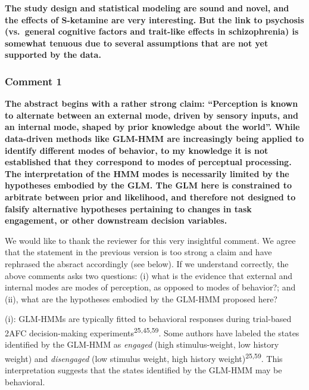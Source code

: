 \documentclass[
]{article}
\begin{document}
\textbf{The study design and statistical modeling are sound and novel,
and the effects of S-ketamine are very interesting. But the link to
psychosis (vs.~general cognitive factors and trait-like effects in
schizophrenia) is somewhat tenuous due to several assumptions that are
not yet supported by the data.}

\subsubsection{Comment 1}\label{comment-1-2}

\textbf{The abstract begins with a rather strong claim: ``Perception is
known to alternate between an external mode, driven by sensory inputs,
and an internal mode, shaped by prior knowledge about the world''. While
data-driven methods like GLM-HMM are increasingly being applied to
identify different modes of behavior, to my knowledge it is not
established that they correspond to modes of perceptual processing. The
interpretation of the HMM modes is necessarily limited by the hypotheses
embodied by the GLM. The GLM here is constrained to arbitrate between
prior and likelihood, and therefore not designed to falsify alternative
hypotheses pertaining to changes in task engagement, or other downstream
decision variables.}

We would like to thank the reviewer for this very insightful comment. We
agree that the statement in the previous version is too strong a claim
and have rephrased the absract accordingly (see below). If we understand
correctly, the above comments asks two questions: (i) what is the
evidence that external and internal modes are modes of perception, as
opposed to modes of behavior?; and (ii), what are the hypotheses
embodied by the GLM-HMM proposed here?

(i): GLM-HMMs are typically fitted to behavioral responses during
trial-based 2AFC decision-making experiments\textsuperscript{25,45,59}.
Some authors have labeled the states identified by the GLM-HMM as
\emph{engaged} (high stimulus-weight, low history weight) and
\emph{disengaged} (low stimulus weight, high history
weight)\textsuperscript{25,59}. This interpretation suggests that the
states identified by the GLM-HMM may be behavioral.
\end{document}
